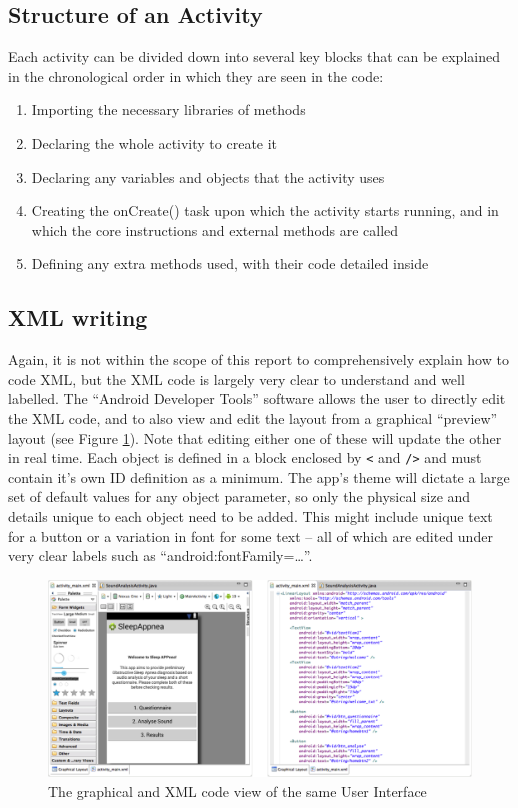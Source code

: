 \subsection{Structure of an Activity}
Each activity can be divided down into several key blocks that can be explained in the chronological order in which they are seen in the code:
\begin{enumerate}
\item Importing the necessary libraries of methods
\item Declaring the whole activity to create it
\item Declaring any variables and objects that the activity uses
\item Creating the onCreate() task upon which the activity starts running, and in which the core instructions and external methods are called
\item Defining any extra methods used, with their code detailed inside
\end{enumerate}
\subsection{XML writing}
Again, it is not within the scope of this report to comprehensively explain how to code XML, but the XML code is largely very clear to understand and well labelled. The ``Android Developer Tools'' software allows the user to directly edit the XML code, and to also view and edit the layout from a graphical ``preview'' layout (see Figure \ref{fig:xmlPages}). Note that editing either one of these will update the other in real time. Each object is defined in a block enclosed by \verb!<! and \verb!/>!  and must contain it's own ID definition as a minimum. The app's theme will dictate a large set of default values for any object parameter, so only the physical size and details unique to each object need to be added. This might include unique text for a button or a variation in font for some text -- all of which are edited under very clear labels such as ``android:fontFamily=\dots''.
\begin{figure}[ht!]
		\centering
			\includegraphics[width=.9\textwidth]{drawings/XML_page.png}
		\caption{The graphical and XML code view of the same User Interface}
		\label{fig:xmlPages}
	\end{figure}
